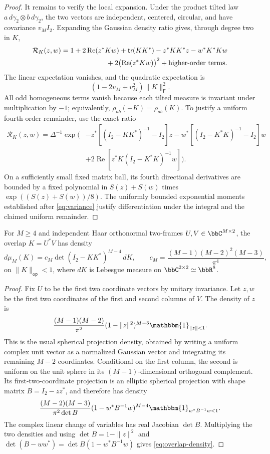 \documentclass[11pt,reqno]{amsart}
\begin{document}
\begin{proof}
It remains to verify the local expansion. Under the product tilted law $a\,d\gamma_2\otimes b\,d\gamma_2$, the two vectors are independent, centered, circular, and have covariance $v_M I_2$. Expanding the Gaussian density ratio gives, through degree two in $K$,
\begin{align*}
 \mathcal R_K(z,w)={}&1+2\operatorname{Re}(z^*Kw)
 +\mathsf{tr}(KK^*)-z^*KK^*z-w^*K^*Kw\\
 &\hspace{18mm}+2\bigl(\operatorname{Re}(z^*Kw)\bigr)^2
 +\text{higher-order terms}.
\end{align*}
The linear expectation vanishes, and the quadratic expectation is
\[
 (1-2v_M+v_M^2)\|K\|_{\mathsf{F}}^2.
\]
All odd homogeneous terms vanish because each tilted measure is invariant under multiplication by $-1$; equivalently, $\rho_{ab}(-K)=\rho_{ab}(K)$. To justify a uniform fourth-order remainder, use the exact ratio
\begin{align*}
 \mathcal R_K(z,w)=\Delta^{-1}\exp\bigl(&-z^*[(I_2-KK^*)^{-1}-I_2]z
 -w^*[(I_2-K^*K)^{-1}-I_2]w\\
 &+2\operatorname{Re}[z^*K(I_2-K^*K)^{-1}w]\bigr).
\end{align*}
On a sufficiently small fixed matrix ball, its fourth directional derivatives are bounded by a fixed polynomial in $S(z)+S(w)$ times $\exp((S(z)+S(w))/8)$. The uniformly bounded exponential moments established after \eqref{eq:variance} justify differentiation under the integral and the claimed uniform remainder.
\end{proof}

\begin{lem}\label{lem:overlap}
For $M\ge4$ and independent Haar orthonormal two-frames $U,V\in\bbC^{M\times2}$, the overlap $K=U^*V$ has density
\begin{equation}\label{eq:overlap-density}
 d\mu_M(K)=c_M\det(I_2-KK^*)^{M-4}\,dK,
 \qquad c_M=\frac{(M-1)(M-2)^2(M-3)}{\pi^4},
\end{equation}
on $\|K\|_{\mathsf{op}}<1$, where $dK$ is Lebesgue measure on $\bbC^{2\times2}\simeq\bbR^8$.
\end{lem}

\begin{proof}
Fix $U$ to be the first two coordinate vectors by unitary invariance. Let $z,w$ be the first two coordinates of the first and second columns of $V$. The density of $z$ is
\[
 \frac{(M-1)(M-2)}{\pi^2}(1-\|z\|^2)^{M-3}\mathbbm{1}_{\|z\|<1}.
\]
This is the usual spherical projection density, obtained by writing a uniform complex unit vector as a normalized Gaussian vector and integrating its remaining $M-2$ coordinates. Conditional on the first column, the second is uniform on the unit sphere in its $(M-1)$-dimensional orthogonal complement. Its first-two-coordinate projection is an elliptic spherical projection with shape matrix $B=I_2-zz^*$, and therefore has density
\[
 \frac{(M-2)(M-3)}{\pi^2\det B}
 (1-w^*B^{-1}w)^{M-4}\mathbbm{1}_{w^*B^{-1}w<1}.
\]
The complex linear change of variables has real Jacobian $\det B$. Multiplying the two densities and using
$\det B=1-\|z\|^2$ and
$\det(B-ww^*)=\det B(1-w^*B^{-1}w)$ gives \eqref{eq:overlap-density}.
\end{proof}
\end{document}
